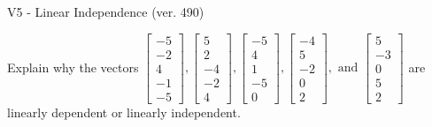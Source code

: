 \begin{exercise}
  \begin{exerciseTitle}V5 - Linear Independence (ver. 490)\end{exerciseTitle}
  \begin{exerciseStatement}
    Explain why the vectors \(\left[\begin{array}{r}
-5 \\
-2 \\
4 \\
-1 \\
-5
\end{array}\right] , \left[\begin{array}{r}
5 \\
2 \\
-4 \\
-2 \\
4
\end{array}\right] , \left[\begin{array}{r}
-5 \\
4 \\
1 \\
-5 \\
0
\end{array}\right] , \left[\begin{array}{r}
-4 \\
5 \\
-2 \\
0 \\
2
\end{array}\right] , \text{ and } \left[\begin{array}{r}
5 \\
-3 \\
0 \\
5 \\
2
\end{array}\right]\) are linearly dependent or linearly independent.	



\end{exerciseStatement}
\end{exercise}
